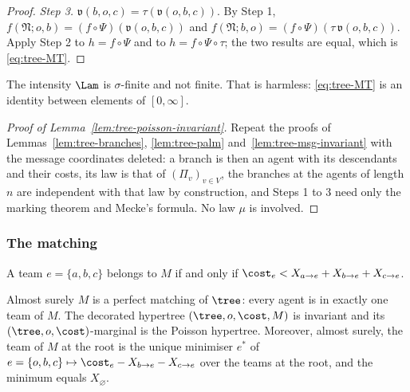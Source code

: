 \begin{proof}
\emph{Step 3.} $\mathfrak{v}(b,o,c)=\tau(\mathfrak{v}(o,b,c))$. By Step 1,
$f(\mathfrak{N};o,b)=(f\circ\Psi)(\mathfrak{v}(o,b,c))$ and
$f(\mathfrak{N};b,o)=(f\circ\Psi)(\tau\,\mathfrak{v}(o,b,c))$. Apply Step 2 to $h=f\circ\Psi$
and to $h=f\circ\Psi\circ\tau$; the two results are equal, which is \eqref{eq:tree-MT}.
\end{proof}

The intensity $\Lam$ is $\sigma$-finite and not finite. That is harmless: \eqref{eq:tree-MT}
is an identity between elements of $[0,\infty]$.

\begin{proof}[Proof of Lemma~\ref{lem:tree-poisson-invariant}]
Repeat the proofs of Lemmas~\ref{lem:tree-branches}, \ref{lem:tree-palm}
and~\ref{lem:tree-msg-invariant} with the message coordinates deleted: a branch is then an
agent with its descendants and their costs, its law is that of
$(\Pi_v)_{v\in V}$, the branches at the agents of length $n$ are independent with that law by
construction, and Steps 1 to 3 need only the marking theorem and Mecke's formula. No law $\mu$
is involved.
\end{proof}

\subsubsection*{The matching}

\begin{definition}\label{def:tree-matching}
A team $e=\{a,b,c\}$ belongs to $M$ if and only if
$\cost_e<X_{a\to e}+X_{b\to e}+X_{c\to e}$.
\end{definition}

\begin{lemma}\label{lem:tree-matching}
Almost surely $M$ is a perfect matching of $\tree$: every agent is in exactly one team of
$M$. The decorated hypertree $(\tree,o,\cost,M)$ is invariant and its
$(\tree,o,\cost)$-marginal is the Poisson hypertree. Moreover, almost surely, the team of $M$
at the root is the unique minimiser $e^*$ of
$e=\{o,b,c\}\mapsto\cost_e-X_{b\to e}-X_{c\to e}$ over the teams at the root, and the minimum
equals $X_\varnothing$.
\end{lemma}


